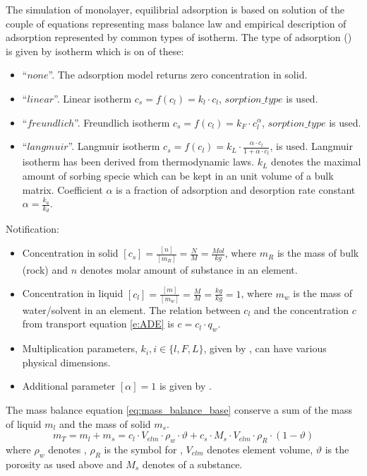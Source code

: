 The simulation of monolayer, equilibrial adsorption is based on solution of the couple of equations 
representing mass balance law and empirical description of adsorption represented by common types of isotherm. 
The type of adsorption () is given by isotherm which is on of these:
\begin{itemize}
 \item ``$none$''. The adsorption model returns zero concentration in solid.
 \item ``$linear$''. Linear isotherm $c_s = f(c_l) = k_l\cdot c_l$, $sorption\_type$ is used.
 \item ``$freundlich$''. Freundlich isotherm $c_s = f(c_l) = k_F\cdot c_l^{\alpha}$, $sorption\_type$ is used.
 \item ``$langmuir$''. Langmuir isotherm $c_s = f(c_l) = k_L\cdot \frac{\alpha\cdot c_l}{1 + \alpha\cdot c_l}$,  
       is used. Langmuir isotherm has been derived from thermodynamic laws. $k_L$ denotes the maximal amount 
       of sorbing specie which can be kept in an unit volume of a bulk matrix. Coefficient $\alpha$ is 
       a fraction of adsorption and desorption rate constant $\alpha = \frac{k_a}{k_d}$.
\end{itemize}
Notification:
\begin{itemize}
 \item Concentration in solid $[c_s] = \frac{[n]}{[m_R]} = \frac{N}{M} = \frac{Mol}{kg}$, where $m_R$ is the 
       mass of bulk (rock) and $n$ denotes molar amount of substance in an element.
 \item Concentration in liquid $[c_l] = \frac{[m]}{[m_w]} = \frac{M}{M} = \frac{kg}{kg} = 1$, where $m_w$ is 
       the mass of water/solvent in an element. The relation between $c_l$ and the concentration $c$ from 
       transport equation \eqref{e:ADE} is $c = c_l \cdot q_w$.
 \item Multiplication parameters, $k_i, i\in\{ l,F,L\}$, given by 
       , can have various physical dimensions.
 \item Additional parameter $[\alpha] = 1$ is given by .
\end{itemize}

The mass balance equation \eqref{eq:mass_balance_base} conserve a sum of the mass of liquid $m_l$ and the mass 
of solid $m_s$.
\begin{equation}
  m_T = m_l + m_s = c_l\cdot V_{elm}\cdot\rho_w\cdot \vartheta 
    + c_s\cdot M_s \cdot V_{elm}\cdot\rho_R\cdot(1-\vartheta)
  \label{eq:mass_balance_base}
\end{equation}
where $\rho_w$ denotes , $\rho_R$ is the symbol for 
, $V_{elm}$ denotes element volume, $\vartheta$ is 
the porosity as used above and $M_s$ denotes  of a substance.


